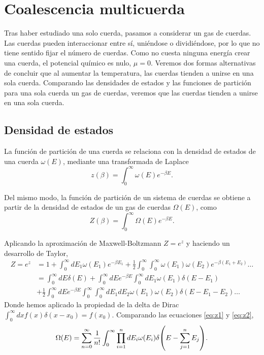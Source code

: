 \section{Coalescencia multicuerda}

Tras haber estudiado una solo cuerda, pasamos a considerar un gas de cuerdas.
Las cuerdas pueden interaccionar entre sí, uniéndose o dividiéndose, por lo que
no tiene sentido fijar el número de cuerdas. 
Como no cuesta ninguna energía crear una cuerda, el potencial químico es nulo, $\mu=0$.
Veremos dos formas alternativas de concluir que al aumentar la temperatura, las cuerdas
tienden a unirse en una sola cuerda.
Comparando las densidades de estados y las funciones de partición para una sola 
cuerda un gas de cuerdas, veremos que las cuerdas tienden a unirse en una sola cuerda.

\subsection{Densidad de estados}


La función de partición de una cuerda se relaciona con la densidad de estados de una cuerda $\omega(E)$, mediante
una transformada de Laplace
\begin{equation}
  z(\beta) = \int_0^\infty \omega(E)e^{-\beta E}.
\end{equation}

Del mismo modo, la función de partición de un sistema de cuerdas se obtiene a partir de la
densidad de estados de un gas de cuerdas $\Omega(E)$, como
\begin{equation}
  Z(\beta) = \int_0^\infty \Omega(E)e^{-\beta E}.
  \label{eq:z1}
\end{equation}

Aplicando la aproximación de Maxwell-Boltzmann $Z=e^z$ y haciendo un desarrollo de Taylor,
\begin{equation}
  \begin{aligned}
      Z = e^z&= 1+ \int_0^\infty dE_1\omega(E_1)e^{-\beta E_1} +\frac 1 2 \int_0^\infty \int_0^\infty
      \omega(E_1)\omega(E_2)e^{-\beta(E_1+E_2)}\dots \\
      &=\int_0^\infty dE \delta(E) + \int_0^\infty dE e^{-\beta E}\int_0^\infty  dE_1\omega(E_1)\delta(E-E_1)\\
      &+\frac 1 2\int_0^\infty dE e^{-\beta E} \int_0^\infty\int_0^\infty dE_1 dE_2 \omega(E_1)\omega(E_2) \delta(E-E_1-E_2)\dots
  \end{aligned}
  \label{eq:z2}
\end{equation}
Donde hemos aplicado la propiedad de la delta de Dirac $\int_0^\infty dx f(x)\delta(x-x_0) = f(x_0)$.
Comparando las ecuaciones \ref{eq:z1} y \ref{eq:z2},
\begin{equation}
  \Omega(E)=\sum_{n=0}^\infty \frac{1}{n!}\int_0^\infty \prod_{i=1}^n dE_i \omega(E_i)\delta\qty(E-\sum_{j=1}^n E_j).
\end{equation}

